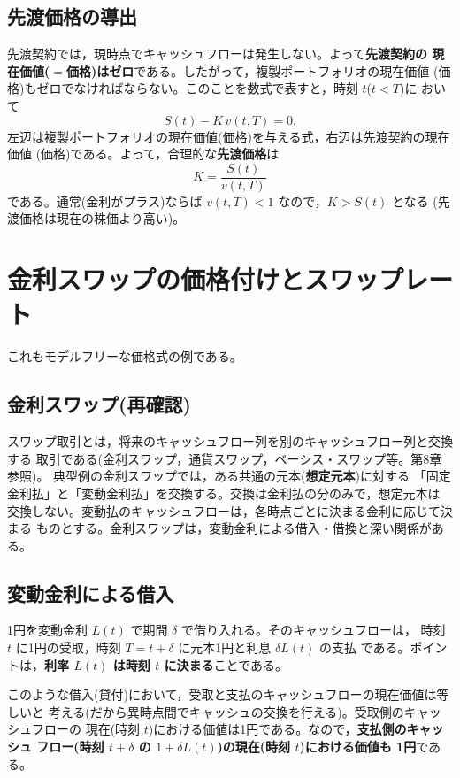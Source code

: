 \subsection{先渡価格の導出}

先渡契約では，現時点でキャッシュフローは発生しない。よって\textbf{先渡契約の
現在価値($=$価格)はゼロ}である。したがって，複製ポートフォリオの現在価値
(価格)もゼロでなければならない。このことを数式で表すと，時刻 $t$($t<T$)に
おいて
\begin{equation}
S(t) - K\,v(t,T) = 0.
\end{equation}
左辺は複製ポートフォリオの現在価値(価格)を与える式，右辺は先渡契約の現在価値
(価格)である。よって，合理的な\textbf{先渡価格}は
\begin{equation}
K = \frac{S(t)}{v(t,T)}
\label{eq:forward-price}
\end{equation}
である。通常(金利がプラス)ならば $v(t,T) < 1$ なので，$K > S(t)$ となる
(先渡価格は現在の株価より高い)。

\section{金利スワップの価格付けとスワップレート}

これもモデルフリーな価格式の例である。

\subsection{金利スワップ(再確認)}

スワップ取引とは，将来のキャッシュフロー列を別のキャッシュフロー列と交換する
取引である(金利スワップ，通貨スワップ，ベーシス・スワップ等。第8章参照)。
典型例の金利スワップでは，ある共通の元本(\textbf{想定元本})に対する
「固定金利払」と「変動金利払」を交換する。交換は金利払の分のみで，想定元本は
交換しない。変動払のキャッシュフローは，各時点ごとに決まる金利に応じて決まる
ものとする。金利スワップは，変動金利による借入・借換と深い関係がある。

\subsection{変動金利による借入}

1円を変動金利 $L(t)$ で期間 $\delta$ で借り入れる。そのキャッシュフローは，
時刻 $t$ に1円の受取，時刻 $T = t+\delta$ に元本1円と利息 $\delta L(t)$ の支払
である。ポイントは，\textbf{利率 $L(t)$ は時刻 $t$ に決まる}ことである。

このような借入(貸付)において，受取と支払のキャッシュフローの現在価値は等しいと
考える(だから異時点間でキャッシュの交換を行える)。受取側のキャッシュフローの
現在(時刻 $t$)における価値は1円である。なので，\textbf{支払側のキャッシュ
フロー(時刻 $t+\delta$ の $1+\delta L(t)$)の現在(時刻 $t$)における価値も
1円}である。

